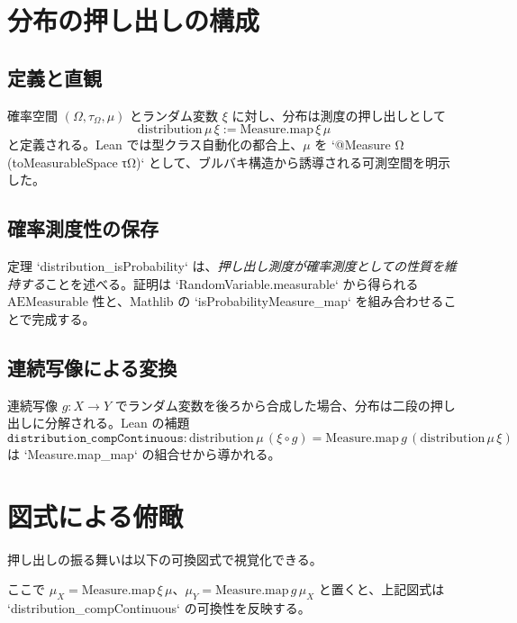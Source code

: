 \documentclass[a4paper]{ltjsarticle}
\begin{document}
\section{分布の押し出しの構成}
\subsection{定義と直観}
確率空間 $(\Omega,\tau_\Omega,\mu)$ とランダム変数 $\xi$ に対し、分布は測度の押し出しとして
\begin{equation*}
  \mathrm{distribution}\,\mu\,\xi := \mathrm{Measure.map}\,\xi\,\mu
\end{equation*}
と定義される。Lean では型クラス自動化の都合上、$\mu$ を `@Measure Ω (toMeasurableSpace τΩ)` として、ブルバキ構造から誘導される可測空間を明示した。

\subsection{確率測度性の保存}
定理 `distribution_isProbability` は、\emph{押し出し測度が確率測度としての性質を維持する}ことを述べる。証明は `RandomVariable.measurable` から得られる $\mathrm{AEMeasurable}$ 性と、Mathlib の `isProbabilityMeasure_map` を組み合わせることで完成する。

\subsection{連続写像による変換}
連続写像 $g : X \to Y$ でランダム変数を後ろから合成した場合、分布は二段の押し出しに分解される。Lean の補題
\[
  \texttt{distribution\_compContinuous}\colon
  \mathrm{distribution}\,\mu\,(\xi \circ g)
  = \mathrm{Measure.map}\,g\,(\mathrm{distribution}\,\mu\,\xi)
\]
は `Measure.map_map` の組合せから導かれる。

\section{図式による俯瞰}
押し出しの振る舞いは以下の可換図式で視覚化できる。
\begin{center}
\end{center}
ここで $\mu_X = \mathrm{Measure.map}\,\xi\,\mu$、$\mu_Y = \mathrm{Measure.map}\,g\,\mu_X$ と置くと、上記図式は `distribution_compContinuous` の可換性を反映する。
\end{document}
